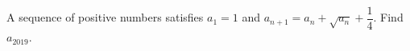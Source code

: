 A sequence of positive numbers satisfies $a_{1}=1$ and $a_{n+1}=a_{n}+\sqrt{a_{n}}+\dfrac{1}{4}$. Find $a_{2019}$.
